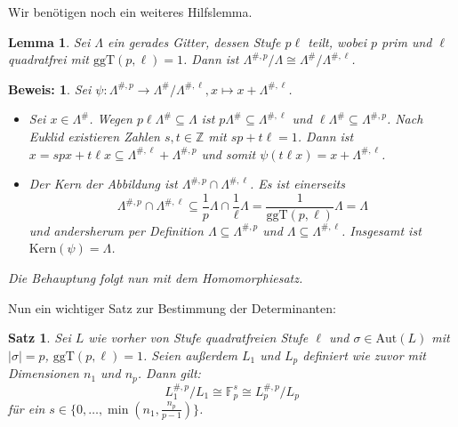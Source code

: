 \documentclass[12pt,a4paper,halfparskip,headsepline,bibtotocnumbered]{scrreprt}
\theoremstyle{nummermitklammern}
\newtheorem{satz}[defsatzusw]{Satz}
\newtheorem{lemma}[defsatzusw]{Lemma}
\theoremstyle{nonumberbreak}
\newtheorem{beweis}{Beweis:}
\newcommand{\Z}{\mathbb{Z}}
\newcommand{\F}{\mathbb{F}}
\newcommand{\Kern}{\text{Kern}}
\newcommand{\ggT}{\text{ggT}}
\newcommand{\Aut}{\text{Aut}}
\begin{document}
Wir benötigen noch ein weiteres Hilfslemma.

\begin{framed}
	\begin{lemma}\label{lem:quotiso}
		Sei $\Lambda$ ein gerades Gitter, dessen Stufe $p \ell$ teilt, wobei $p$ prim und $\ell$ quadratfrei mit $\ggT(p, \ell) = 1$. Dann ist $\Lambda^{\#,p} / \Lambda \cong \Lambda^\# / \Lambda^{\#,\ell}$.
	\end{lemma}
\end{framed}

\begin{beweis}
	Sei $\psi:\Lambda^{\#,p} \rightarrow \Lambda^\# / \Lambda^{\#, \ell}, x \mapsto x + \Lambda^{\#, \ell}$.
	\begin{itemize}[align=left, leftmargin = *]
		\item[Surjektivität:] Sei $x \in \Lambda^\#$. Wegen $p \ell \Lambda^\# \subseteq \Lambda$ ist $p \Lambda^\# \subseteq \Lambda^{\#, \ell}$ und $\ell \Lambda^\# \subseteq \Lambda^{\#, p}$. Nach Euklid existieren Zahlen $s, t \in \Z$ mit $s p + t \ell = 1$. Dann ist $x = s p x + t \ell x \subseteq \Lambda^{\#, \ell} + \Lambda^{\#, p}$ und somit $\psi(t \ell x) = x + \Lambda^{\#, \ell}$.
		\item[Kern:] Der Kern der Abbildung ist $\Lambda^{\#, p} \cap \Lambda^{\#, \ell}$. Es ist einerseits
		\begin{equation*}
			\Lambda^{\#, p} \cap \Lambda^{\#, \ell} \subseteq \frac{1}{p} \Lambda \cap \frac{1}{\ell} \Lambda = \frac{1}{\ggT(p, \ell)}\Lambda = \Lambda
		\end{equation*}
		und andersherum per Definition $\Lambda \subseteq \Lambda^{\#,p}$ und $\Lambda \subseteq \Lambda^{\#, \ell}$. Insgesamt ist\linebreak
		$\Kern(\psi) = \Lambda$.
	\end{itemize}
	Die Behauptung folgt nun mit dem Homomorphiesatz.
\end{beweis}

Nun ein wichtiger Satz zur Bestimmung der Determinanten:

\begin{framed}
	\begin{satz} \label{th:fps}
		Sei $L$ wie vorher von Stufe quadratfreien Stufe $\ell$ und $\sigma \in \Aut(L)$ mit $\vert \sigma \vert = p$, $\ggT(p,\ell) = 1$. Seien außerdem $L_1$ und $L_p$ definiert wie zuvor mit Dimensionen $n_1$ und $n_p$. Dann gilt:
		\begin{equation*}
			L_1^{\#,p} / L_1 \cong \F_p^s \cong L_p^{\#,p} / L_p
		\end{equation*}
		für ein $s \in \lbrace 0, \dots, \min(n_1, \frac{n_p}{p-1})\rbrace$.
	\end{satz}
\end{framed}
\end{document}
